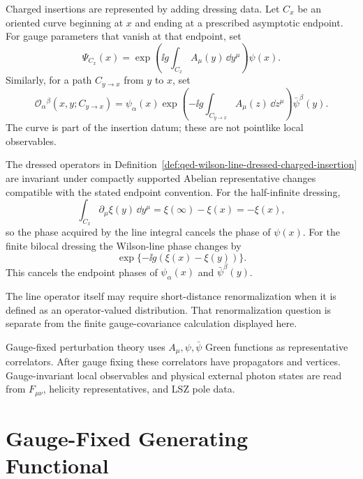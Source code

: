 \begin{definition}
\label{def:qed-wilson-line-dressed-charged-insertion}
Charged insertions are represented by adding dressing data. Let \(C_x\) be an
oriented curve beginning at \(x\) and ending at a prescribed asymptotic
endpoint. For gauge parameters that vanish at that endpoint, set
\[
  \Psi_{C_x}(x)
  =
  \exp\left(\ii g\int_{C_x} A_\mu(y)\,\dd y^\mu\right)\psi(x).
\]
Similarly, for a path \(C_{y\to x}\) from \(y\) to \(x\), set
\[
  \mathcal O_{\alpha}{}^{\beta}(x,y;C_{y\to x})
  =
  \psi_\alpha(x)
  \exp\left(
    -\ii g\int_{C_{y\to x}} A_\mu(z)\,\dd z^\mu
  \right)
  \bar\psi^\beta(y).
\]
The curve is part of the insertion datum; these are not pointlike local
observables.
\end{definition}

\begin{remark}
\label{prop:qed-wilson-dressing-endpoint-cancellation}
The dressed operators in
Definition~\ref{def:qed-wilson-line-dressed-charged-insertion} are invariant
under compactly supported Abelian representative changes compatible with the
stated endpoint convention.
For the half-infinite dressing,
\[
  \int_{C_x}\partial_\mu\xi(y)\,\dd y^\mu
  =
  \xi(\infty)-\xi(x)
  =
  -\xi(x),
\]
so the phase acquired by the line integral cancels the phase of \(\psi(x)\).
For the finite bilocal dressing the Wilson-line phase changes by
\[
  \exp\{-\ii g(\xi(x)-\xi(y))\}.
\]
This cancels the endpoint phases of \(\psi_\alpha(x)\) and
\(\bar\psi^\beta(y)\).
\end{remark}

The line operator itself may require short-distance
renormalization when it is defined as an operator-valued distribution. That
renormalization question is separate from the finite gauge-covariance
calculation displayed here.

\begin{remark}
Gauge-fixed perturbation theory uses \(A_\mu,\psi,\bar\psi\) Green functions
as representative correlators. After gauge fixing these correlators have
propagators and vertices. Gauge-invariant local observables and physical
external photon states are read from \(F_{\mu\nu}\), helicity representatives,
and LSZ pole data.
\end{remark}

\section{Gauge-Fixed Generating Functional}

